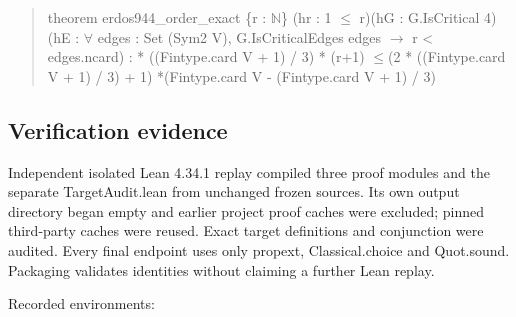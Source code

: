\documentclass[11pt,a4paper]{article}
\begin{document}
\begin{quote}\small\ttfamily theorem erdos944\_order\_exact \{r : \ensuremath{\mathbb{N}}\} (hr : 1 \ensuremath{\leq} r)\newline (hG : G.IsCritical 4)\newline (hE : \ensuremath{\forall} edges : Set (Sym2 V), G.IsCriticalEdges edges \ensuremath{\to} r < edges.ncard) : * ((Fintype.card V + 1) / 3) * (r+1) \ensuremath{\leq}\newline (2 * ((Fintype.card V + 1) / 3) + 1) *\newline (Fintype.card V - (Fintype.card V + 1) / 3)\end{quote}
\begin{samepage}
\subsection{Verification evidence}
Independent isolated Lean 4.34.1 replay compiled three proof modules and the separate TargetAudit.lean from unchanged frozen sources. Its own output directory began empty and earlier project proof caches were excluded; pinned third-party caches were reused. Exact target definitions and conjunction were audited. Every final endpoint uses only propext, Classical.choice and Quot.sound. Packaging validates identities without claiming a further Lean replay.

Recorded environments:


\end{samepage}
\end{document}

